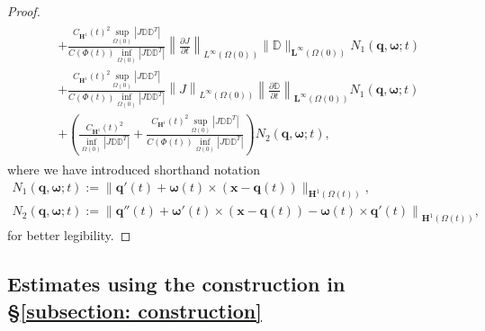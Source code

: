 \documentclass[a4paper]{amsart}
\numberwithin{equation}{section}
\newcommand{\ddt}[1]{\frac{\partial #1}{\partial t}}
\theoremstyle{plain}
\newcommand{\mbf}[1]{\mathbf{#1}}
\newcommand{\mbb}[1]{\mathbb{#1}}
\begin{document}
\begin{proof}
\begin{align}
\begin{aligned}
    &+ \frac{C_{\mbf{H}^1}(t)^2 \sup_{\Omega(0)}|J \mbb{D} \mbb{D}^T|}{C(\Phi(t)) \inf_{\Omega(0)} |J \mbb{D} \mbb{D}^T| }\left\|  \ddt{J} \right\|_{L^\infty(\Omega(0))} \| \mbb{D}\|_{\mbf{L}^\infty(\Omega(0))} N_1(\mbf{q}, \boldsymbol{\omega};t)\\
    &+ \frac{C_{\mbf{H}^1}(t)^2 \sup_{\Omega(0)}|J \mbb{D} \mbb{D}^T|}{C(\Phi(t)) \inf_{\Omega(0)} |J \mbb{D} \mbb{D}^T| }\left\|  J \right\|_{L^\infty(\Omega(0))} \left\| \ddt{\mbb{D}}\right\|_{\mbf{L}^\infty(\Omega(0))} N_1(\mbf{q}, \boldsymbol{\omega};t)\\
    &+ \left(\frac{C_{\mbf{H}^1}(t)^2}{\inf_{\Omega(0)} |J \mbb{D} \mbb{D}^T|} + \frac{C_{\mbf{H}^1}(t)^2 \sup_{\Omega(0)}|J \mbb{D} \mbb{D}^T|}{C(\Phi(t)) \inf_{\Omega(0)} |J \mbb{D} \mbb{D}^T| }\right) N_2(\mbf{q}, \boldsymbol{\omega};t),
    \end{aligned}
    \label{stokes regularity3}
\end{align}
where we have introduced shorthand notation
\begin{gather*}
    N_1(\mbf{q}, \boldsymbol{\omega};t) := \| \mbf{q}'(t) + \boldsymbol{\omega}(t)\times(\mbf{x} - \mbf{q}(t)) \|_{\mbf{H}^{1}(\Omega(t))},\\
    N_2(\mbf{q}, \boldsymbol{\omega};t) := \left\| \mbf{q}''(t) + \boldsymbol{\omega}'(t)\times(\mbf{x} - \mbf{q}(t)) - \boldsymbol{\omega}(t) \times \mbf{q}'(t) \right\|_{\mbf{H}^1(\Omega(t))},
\end{gather*}
for better legibility.
\end{proof}

\subsection{Estimates using the construction in \S \ref{subsection: construction}}
\end{document}
